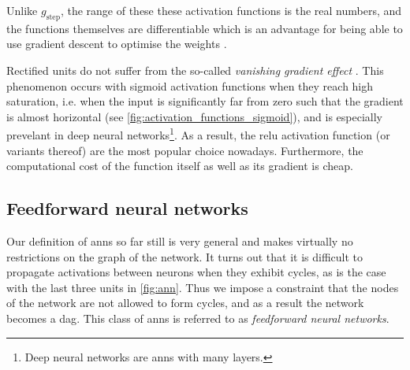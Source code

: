 \documentclass[../main.tex]{subfiles}
\begin{document}
Unlike $g_\text{step}$, the range of these these activation functions is the real numbers, and the functions themselves are differentiable which is an advantage for being able to use gradient descent to optimise the weights \cite[729]{russell2010}.

Rectified units do not suffer from the so-called \emph{vanishing gradient effect} \cite{glorot2011}.
This phenomenon occurs with sigmoid activation functions when they reach high saturation, i.e. when the input is significantly far from zero such that the gradient is almost horizontal (see \cref{fig:activation_functions_sigmoid}), and is especially prevelant in deep neural networks\footnote{Deep neural networks are \glspl{ann} with many layers.}.
As a result, the \gls{relu} activation function (or variants thereof) are the most popular choice nowadays.
Furthermore, the computational cost of the function itself as well as its gradient is cheap.

\subsection{Feedforward neural networks}
Our definition of \glspl{ann} so far still is very general and makes virtually no restrictions on the graph of the network.
It turns out that it is difficult to propagate activations between neurons when they exhibit cycles, as is the case with the last three units in \cref{fig:ann}.
Thus we impose a constraint that the nodes of the network are not allowed to form cycles, and as a result the network becomes a \gls{dag}.
This class of \glspl{ann} is referred to as \emph{feedforward neural networks}.
\end{document}
